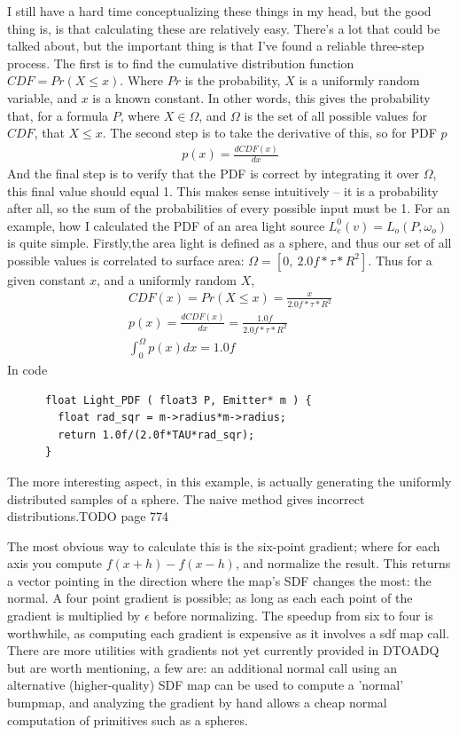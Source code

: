 \documentclass{article}
\begin{document}
    I still have a hard time conceptualizing these things in my head, but the
    good thing is, is that calculating these are relatively easy. There's a lot
    that could be talked about, but the important thing is that I've found a
    reliable three-step process. The first is to
    find the cumulative distribution function $CDF = Pr(X \leq x)$. Where $Pr$
    is the probability, $X$ is a uniformly random variable, and $x$ is a known
    constant. In other words, this gives the probability that, for a formula
    $P$, where $X \in \Omega$, and $\Omega$ is the set of all possible values
    for $CDF$,
    that $X \leq x$. The second step is to take the derivative of this, so for
    PDF $p$
    \begin{align}
      p(x) = \frac{dCDF(x)}{dx}
    \end{align}
    And the final step is to verify that the PDF is correct by integrating it
    over $\Omega$, this final value should equal 1. This makes sense intuitively
    -- it is a probability after all, so the sum of the probabilities of every
    possible input must be 1.
    For an example, how I calculated the PDF of an area light source
      $L^0_e(v) = L_o(P, \omega_o)$ 
    is quite simple. Firstly,the area light is defined as a sphere, and thus our
    set of all possible values is correlated to surface area:
    $\Omega = [0,\:2.0f*\tau*R^2]$.
    Thus for a given constant $x$, and a uniformly random $X$,
    \begin{align}
      CDF(x) = Pr(X \leq x) = \frac{x}{2.0f*\tau*R^2}\\
      p(x) = \frac{dCDF(x)}{dx} = \frac{1.0f}{2.0f*\tau*R^2}\\
      \int_0^{\Omega}p(x)dx = 1.0f
    \end{align}
    In code
    \begin{lstlisting}
      float Light_PDF ( float3 P, Emitter* m ) {
        float rad_sqr = m->radius*m->radius;
        return 1.0f/(2.0f*TAU*rad_sqr);
      }
    \end{lstlisting}
    The more interesting aspect, in this example, is actually generating the
    uniformly distributed samples of a sphere. The naive method gives incorrect
    distributions.TODO {page 774}
    
    The most obvious way to calculate this is the six-point gradient; where for
    each axis you compute $f(x+h) - f(x-h)$, and normalize the result. This
    returns a vector pointing in the direction where the map's SDF changes the
    most: the normal. A four point gradient is possible; as long as each each
    point of the gradient is multiplied by $\epsilon$ before normalizing. The
    speedup from six to four is worthwhile, as computing each gradient is
    expensive as it involves a sdf map call. There are more utilities with
    gradients not yet currently provided in DTOADQ but are worth mentioning, a
    few are: an additional normal call using an alternative (higher-quality) SDF
    map can be used to compute a 'normal' bumpmap, and analyzing the gradient by
    hand allows a cheap normal computation of primitives such as a spheres.
  
\end{document}
